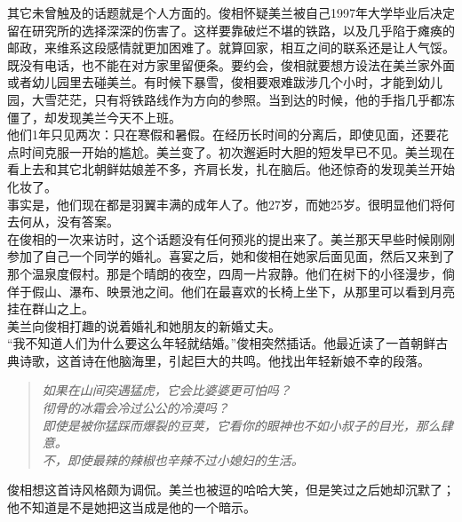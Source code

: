 其它未曾触及的话题就是个人方面的。俊相怀疑美兰被自己1997年大学毕业后决定留在研究所的选择深深的伤害了。这样要靠破烂不堪的铁路，以及几乎陷于瘫痪的邮政，来维系这段感情就更加困难了。就算回家，相互之间的联系还是让人气馁。既没有电话，也不能在对方家里留便条。要约会，俊相就要想方设法在美兰家外面或者幼儿园里去碰美兰。有时候下暴雪，俊相要艰难跋涉几个小时，才能到幼儿园，大雪茫茫，只有将铁路线作为方向的参照。当到达的时候，他的手指几乎都冻僵了，却发现美兰今天不上班。\\

他们1年只见两次：只在寒假和暑假。在经历长时间的分离后，即使见面，还要花点时间克服一开始的尴尬。美兰变了。初次邂逅时大胆的短发早已不见。美兰现在看上去和其它北朝鲜姑娘差不多，齐肩长发，扎在脑后。他还惊奇的发现美兰开始化妆了。\\

事实是，他们现在都是羽翼丰满的成年人了。他27岁，而她25岁。很明显他们将何去何从，没有答案。\\

在俊相的一次来访时，这个话题没有任何预兆的提出来了。美兰那天早些时候刚刚参加了自己一个同学的婚礼。喜宴之后，她和俊相在她家后面见面，然后又来到了那个温泉度假村。那是个晴朗的夜空，四周一片寂静。他们在树下的小径漫步，倘佯于假山、瀑布、映景池之间。他们在最喜欢的长椅上坐下，从那里可以看到月亮挂在群山之上。\\

美兰向俊相打趣的说着婚礼和她朋友的新婚丈夫。\\

“我不知道人们为什么要这么年轻就结婚。”俊相突然插话。他最近读了一首朝鲜古典诗歌，这首诗在他脑海里，引起巨大的共鸣。他找出年轻新娘不幸的段落。\\

\begin{quote}
	\begin{spacing}{1.0}  %
		\textit{{\footnotesize 	如果在山间突遇猛虎，它会比婆婆更可怕吗？\\
		彻骨的冰霜会冷过公公的冷漠吗？\\
		即使是被你猛踩而爆裂的豆荚，它看你的眼神也不如小叔子的目光，那么肆意。\\
		不，即使最辣的辣椒也辛辣不过小媳妇的生活。\\}}
	\end{spacing}
\end{quote}

俊相想这首诗风格颇为调侃。美兰也被逗的哈哈大笑，但是笑过之后她却沉默了；他不知道是不是她把这当成是他的一个暗示。\\

